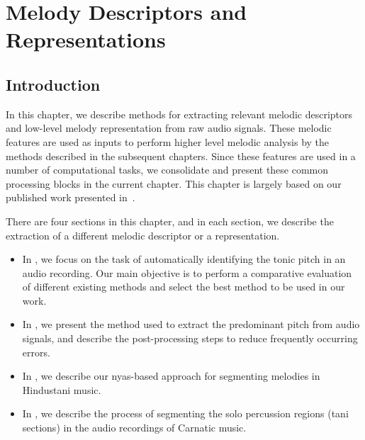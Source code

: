 
\chapter{Melody Descriptors and Representations}
\label{chap:data_preprocessing}

\section{Introduction}
\label{sec:data_preprocessing_intro}

In this chapter, we describe methods for extracting relevant melodic descriptors and low-level melody representation from raw audio signals.  These melodic features are used as inputs to perform higher level melodic analysis by the methods described in the subsequent chapters. Since these features are used in a number of computational tasks, we consolidate and present these common processing blocks in the current chapter. This chapter is largely based on our published work presented in~\cite{Gulati2014Tonic,gulati2014Landmark,gulati_SITIS_2014}.

There are four sections in this chapter, and in each section, we describe the extraction of a different melodic descriptor or a representation.
\begin{itemize}
	\item In , we focus on the task of automatically identifying the tonic pitch in an audio recording. Our main objective is to perform a comparative evaluation of different existing methods and select the best method to be used in our work.
	\item In , we present the method used to extract the predominant pitch from audio signals, and describe the post-processing steps to reduce frequently occurring errors.
	\item In , we describe our \gls{nyas}-based approach for segmenting melodies in Hindustani music. 
	\item In , we describe the process of segmenting the solo percussion regions (\Gls{tani} sections) in the audio recordings of Carnatic music.  
\end{itemize}
	

